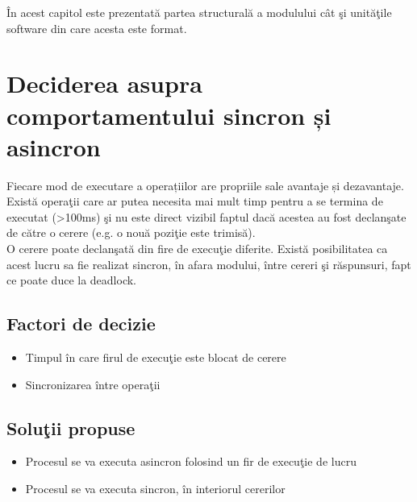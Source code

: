\label{cap3}


\label{Chapter3} %

\thispagestyle{fancy}

În acest capitol este prezentată partea structurală a modulului cât şi unităţile software din care acesta este format.

\section{Deciderea asupra comportamentului sincron și asincron} 
	Fiecare mod de executare a operațiilor are propriile sale avantaje și dezavantaje.
	Există operaţii care ar putea necesita mai mult timp pentru a se termina de executat (>100ms) şi nu este direct vizibil faptul dacă acestea au fost declanşate de către o cerere (e.g. o  nouă poziţie este trimisă).
	\vspace{6pt}
    \\O cerere poate declanşată din fire de execuţie diferite.
	Există posibilitatea ca acest lucru sa fie realizat sincron, în afara modului, între cereri şi răspunsuri, fapt ce poate duce la deadlock.

	\subsection{Factori de decizie} 
	\begin{itemize}
	 \setlength\itemsep{0em}
		\item Timpul în care firul de execuţie este blocat de cerere
		\item Sincronizarea între operaţii
	\end{itemize}

	\subsection{Soluţii propuse}
	\begin{itemize}
	 \setlength\itemsep{0em}
		\item Procesul se va executa asincron folosind un fir de execuţie de lucru
		\item Procesul se va executa sincron, în interiorul cererilor
	\end{itemize}


